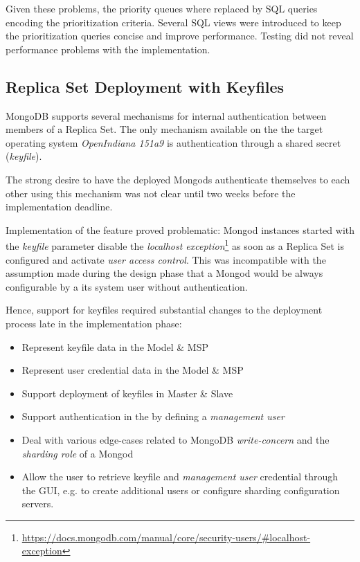 Given these problems, the priority queues where replaced by SQL queries encoding the prioritization criteria.
Several SQL views were introduced to keep the prioritization queries concise and improve performance.
Testing did not reveal performance problems with the  implementation.

\subsection{Replica Set Deployment with Keyfiles}\label{di:keyfiles}

MongoDB supports several mechanisms for internal authentication between members of a Replica Set. The only mechanism available on the
the target operating system \textit{OpenIndiana 151a9} is authentication through a shared secret (\textit{keyfile}).

The strong desire to have the deployed Mongods authenticate themselves to each other using this mechanism was not clear 
until two weeks before the implementation deadline.

Implementation of the feature proved problematic: Mongod instances started with the \textit{keyfile} parameter disable the 
\textit{localhost exception}\footnote{\url{https://docs.mongodb.com/manual/core/security-users/\#localhost-exception}}
as soon as a Replica Set is configured and activate \textit{user access control}. %
This was incompatible with the assumption made during the design phase that a Mongod would be always configurable by a its system user without authentication.

Hence, support for keyfiles required substantial changes to the deployment process late in the implementation phase:

\begin{itemize}
  \item Represent keyfile data in the Model \& MSP
  \item Represent user credential data in the Model \& MSP
  \item Support deployment of keyfiles in Master \& Slave
  \item Support authentication in the  by defining a \textit{management user}
  \item Deal with various edge-cases related to MongoDB \textit{write-concern} and the \textit{sharding role} of a Mongod
  \item Allow the user to retrieve keyfile and \textit{management user} credential through the GUI,
        e.g. to create additional users or configure sharding configuration servers.
\end{itemize}

